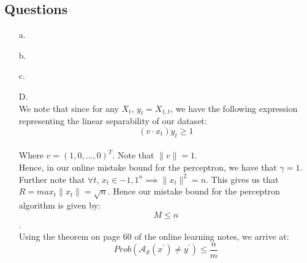 \documentclass[12pt]{article}
\begin{document}
\subsection{Questions}
\begin{itemize}
    \item[a.]
    \item[b.]
    \item[c.]
    \item[D.]\\
    We note that since for any $X_{t}$, $y_{t} = X_{1,t}$, we have the following
     expression representing the linear separability of our dataset:\\
    \[(v \cdot x_{t})y_{t} \ge 1\]\\
    Where $v = (1,0, \dots, 0)^{T}$. Note that $\|v\| =1$.\\
    Hence, in our online mistake bound for the perceptron, we have that $\gamma =1$.
    Further note that $\forall t$, $x_{t} \in {-1,1}^{n} \implies \|x_{t}\|^{2}
    = n$. This gives us that $R = max_{t} \|x_{t}\| = \sqrt{n}$.
    Hence our mistake bound for the perceptron algorithm is given by:\\
    
    \[M \le n \].\\

    Using the theorem on page 60 of the online learning notes, we arrive at:\\

    \[Prob(\mathcal{A_{S}}(x ^{\prime}) \ne y^{\prime} ) \le \frac{n}{m}\]\\

     
\end{itemize}
\end{document}
